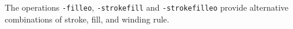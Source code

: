 \documentclass{book}
\begin{document}
\bigskip
\ifdefined\HCode
{}
\else
{}
\fi
\bigskip

\noindent The operations \texttt{-filleo}, \texttt{-strokefill} and \texttt{-strokefilleo} provide alternative combinations of stroke, fill, and winding rule.
\end{document}
